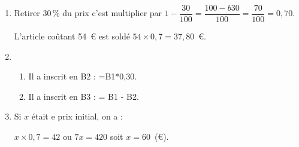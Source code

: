 
\medskip 

%

\begin{enumerate}
\item %
Retirer 30\,\% du prix c'est multiplier par $1 - \dfrac{30}{100} = \dfrac{100 - b30}{100} = \dfrac{70}{100} = 0,70$.

L'article coûtant 54~\euro{} est soldé $54 \times 0,7 = 37,80$~\euro. 
\item %


	\begin{enumerate}
		\item %
Il a inscrit en B2 : =B1*0,30. 
		\item %
Il a inscrit en B3 : = B1 - B2. 
	\end{enumerate}
\item %
Si $x$ était e prix initial, on a :

$x \times 0,7 = 42$ ou $7x = 420$ soit $x = 60$~(\euro).  
\end{enumerate}

\bigskip

